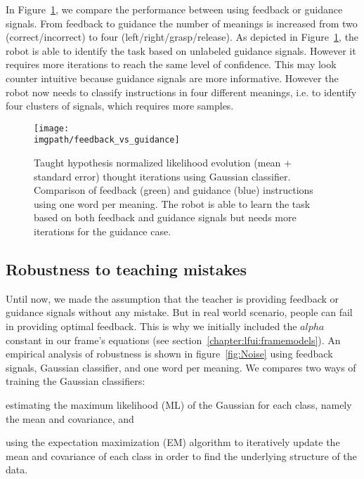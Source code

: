 In Figure~\ref{fig:Guidance}, we compare the performance between using feedback or guidance signals. From feedback to guidance the number of meanings is increased from two (correct/incorrect) to four (left/right/grasp/release). As depicted in Figure~\ref{fig:Guidance}, the robot is able to identify the task based on unlabeled guidance signals. However it requires more iterations to reach the same level of confidence. This may look counter intuitive because guidance signals are more informative. However the robot now needs to classify instructions in four different meanings, i.e. to identify four clusters of signals, which requires more samples. 

\begin{figure}[!htbp]
  \centering
  \texttt{[image: \\imgpath/feedback\_vs\_guidance]}
  \caption{Taught hypothesis normalized likelihood evolution (mean + standard error) thought iterations using Gaussian classifier. Comparison of feedback (green) and guidance (blue) instructions using one word per meaning. The robot is able to learn the task based on both feedback and guidance signals but needs more iterations for the guidance case.}
  \label{fig:Guidance}
\end{figure}

\subsection{Robustness to teaching mistakes}

Until now, we made the assumption that the teacher is providing feedback or guidance signals without any mistake. But in real world scenario, people can fail in providing optimal feedback. This is why we initially included the $alpha$ constant in our frame's equations (see section~\ref{chapter:lfui:framemodels}). An empirical analysis of robustness is shown in figure~\ref{fig:Noise} using feedback signals, Gaussian classifier, and one word per meaning. We compares two ways of training the Gaussian classifiers: \begin{inparaenum}[(1)] \item estimating the maximum likelihood (ML) of the Gaussian for each class, namely the mean and covariance, and \item using the expectation maximization (EM) algorithm \cite{dempster1977maximum} to iteratively update the mean and covariance of each class in order to find the underlying structure of the data. \end{inparaenum} 

